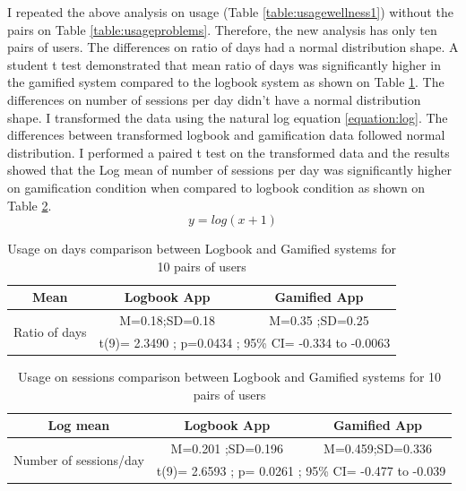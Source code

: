 I repeated the above analysis on usage (Table \ref{table:usagewellness1}) without the pairs on Table \ref{table:usageproblems}. Therefore, the new analysis has only ten pairs of users. The differences on ratio of days had a normal distribution shape. A student t test demonstrated that mean ratio of days was significantly higher in the gamified system compared to the logbook system as shown on Table \ref{table:usagewellness2r}. The differences on number of sessions per day didn't have a normal distribution shape. I transformed the data using the natural log equation \ref{equation:log}. The differences between transformed logbook and gamification data followed normal distribution. I performed a paired t test on the transformed data and the results showed that the Log mean of number of sessions per day was significantly higher on gamification condition when compared to logbook condition as shown on Table \ref{table:usagewellness2s}.\newline
\begin{equation}
\label{equation:log}
y=log (x+1)
\end{equation}
\begin{table}[h!]
  \begin{center}
    \caption{Usage on days comparison between Logbook and Gamified systems for 10 pairs of users}
    \label{table:usagewellness2r}
	\begin{tabular}{|c|c|c|}
		\hline
		Mean &Logbook App&Gamified App\\
		\hline
		 \multirow{2}{*}{Ratio of days}&M=0.18;SD=0.18&M=0.35 ;SD=0.25\\\cline{2-3} 

		 &\multicolumn{2}{|l|}{t(9)= 2.3490 ; p=0.0434 ; 95\% CI=  -0.334 to -0.0063} \\
\hline
	\end{tabular}
  \end{center}
\end{table}
\newline  
\begin{table}[h!]
  \begin{center}
    \caption{Usage on sessions comparison between Logbook and Gamified systems for 10 pairs of users}
    \label{table:usagewellness2s}
	\begin{tabular}{|c|c|c|}
		\hline
		Log mean &Logbook App&Gamified App\\
		\hline
		 \multirow{2}{*}{ Number of sessions/day}&M=0.201 ;SD=0.196&M=0.459;SD=0.336\\\cline{2-3} 
		
		 &\multicolumn{2}{|l|}{t(9)= 2.6593 ; p= 0.0261 ; 95\% CI=  -0.477 to -0.039 } \\
\hline
	\end{tabular}
  \end{center}
\end{table}\newline
